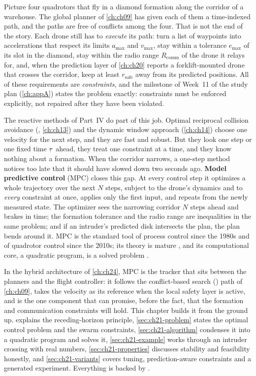 Picture four quadrotors that fly in a diamond formation along the corridor of
a warehouse. The global planner of \cref{ch:ch09} has given each of them a
time-indexed path, and the paths are free of conflicts among the four. That is
not the end of the story. Each drone still has to \emph{execute} its path: turn
a list of waypoints into accelerations that respect its limits $a_{\max}$ and
$v_{\max}$, stay within a tolerance $e_{\max}$ of its slot in the diamond,
stay within the radio range $R_{\mathrm{comm}}$ of the drone it relays for,
and, when the prediction layer of \cref{ch:ch20} reports a forklift-mounted
drone that crosses the corridor, keep at least $r_{\mathrm{safe}}$ away from
its predicted positions. All of these requirements are \emph{constraints}, and
the milestone of Week~11 of the study plan (\cref{ch:appA}) states the
problem exactly: constraints must be enforced explicitly, not repaired after
they have been violated.

The reactive methods of Part~IV do part of this job. Optimal reciprocal
collision avoidance (\orca, \cref{ch:ch13})
and the dynamic window approach (\cref{ch:ch14}) choose one velocity for the
next step, and they are fast and robust. But they look one step or one fixed
time $\tau$ ahead, they treat one constraint at a time, and they know nothing
about a formation. When the corridor narrows, a one-step method notices too
late that it should have slowed down two seconds ago. \textbf{Model
predictive control} (MPC) closes this gap.
At every control step it optimizes a whole trajectory over the next $N$ steps,
subject to the drone's dynamics and to \emph{every} constraint at once, applies
only the first input, and repeats from the newly measured state. The optimizer
sees the narrowing corridor $N$ steps ahead and brakes in time; the formation
tolerance and the radio range are inequalities in the same problem; and if an
intruder's predicted disk intersects the plan, the plan bends around it. MPC is
the standard tool of process control since the 1980s
\cite{garcia1989model} and of quadrotor control since the 2010s; its theory is
mature \cite{mayne2000constrained,rawlings2017mpc}, and its computational core,
a quadratic program, is a solved problem \cite{boyd2004convex}.

In the hybrid architecture of \cref{ch:ch24}, MPC is the tracker that sits
between the planners and the flight controller: it follows the
conflict-based search (\cbs) path of \cref{ch:ch09},
takes the \orca velocity as its reference when the local safety layer is active,
and is the one component that can promise, before the fact, that the
formation and communication constraints will hold. This chapter builds it
from the ground up.  explains the receding-horizon
principle, \cref{sec:ch21-problem} states the optimal control problem and the
swarm constraints, \cref{sec:ch21-algorithm} condenses it into a quadratic
program and solves it, \cref{sec:ch21-example} works through an intruder
crossing with real numbers, \cref{sec:ch21-properties} discusses stability
and feasibility honestly, and \cref{sec:ch21-variants} covers tuning,
prediction-aware constraints and a generated experiment. Everything is
backed by .

